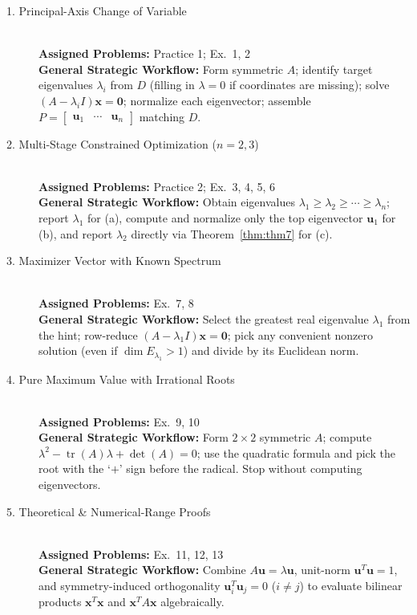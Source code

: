 \documentclass[11pt, letterpaper]{article}
\theoremstyle{definition}
\theoremstyle{remark}
\begin{document}
\begin{description}
    \item[1. Principal-Axis Change of Variable] \hfill \\
    \textbf{Assigned Problems:} Practice 1; Ex.\ 1, 2 \\
    \textbf{General Strategic Workflow:} Form symmetric $A$; identify target eigenvalues $\lambda_i$ from $D$ (filling in $\lambda = 0$ if coordinates are missing); solve $(A - \lambda_i I)\mathbf{x} = \mathbf{0}$; normalize each eigenvector; assemble $P = \begin{bmatrix} \mathbf{u}_1 & \cdots & \mathbf{u}_n \end{bmatrix}$ matching $D$.

    \item[2. Multi-Stage Constrained Optimization ($n=2,3$)] \hfill \\
    \textbf{Assigned Problems:} Practice 2; Ex.\ 3, 4, 5, 6 \\
    \textbf{General Strategic Workflow:} Obtain eigenvalues $\lambda_1 \ge \lambda_2 \ge \cdots \ge \lambda_n$; report $\lambda_1$ for (a), compute and normalize only the top eigenvector $\mathbf{u}_1$ for (b), and report $\lambda_2$ directly via Theorem~\ref{thm:thm7} for (c).

    \item[3. Maximizer Vector with Known Spectrum] \hfill \\
    \textbf{Assigned Problems:} Ex.\ 7, 8 \\
    \textbf{General Strategic Workflow:} Select the greatest real eigenvalue $\lambda_1$ from the hint; row-reduce $(A - \lambda_1 I)\mathbf{x} = \mathbf{0}$; pick any convenient nonzero solution (even if $\dim E_{\lambda_1} > 1$) and divide by its Euclidean norm.

    \item[4. Pure Maximum Value with Irrational Roots] \hfill \\
    \textbf{Assigned Problems:} Ex.\ 9, 10 \\
    \textbf{General Strategic Workflow:} Form $2 \times 2$ symmetric $A$; compute $\lambda^2 - \operatorname{tr}(A)\lambda + \det(A) = 0$; use the quadratic formula and pick the root with the `$+$' sign before the radical. Stop without computing eigenvectors.

    \item[5. Theoretical \& Numerical-Range Proofs] \hfill \\
    \textbf{Assigned Problems:} Ex.\ 11, 12, 13 \\
    \textbf{General Strategic Workflow:} Combine $A\mathbf{u} = \lambda \mathbf{u}$, unit-norm $\mathbf{u}^T \mathbf{u} = 1$, and symmetry-induced orthogonality $\mathbf{u}_i^T \mathbf{u}_j = 0$ ($i \neq j$) to evaluate bilinear products $\mathbf{x}^T \mathbf{x}$ and $\mathbf{x}^T A \mathbf{x}$ algebraically.


\end{description}
\end{document}
